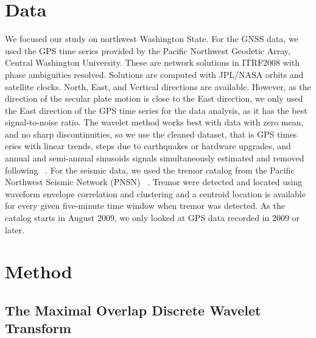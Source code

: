 \documentclass[draft]{agujournal2018}
\begin{document}
\section{Data}

We focused our study on northwest Washington State. For the GNSS data, we used the GPS time series provided by the Pacific Northwest Geodetic Array, Central Washington University. These are network solutions in ITRF2008 with phase ambiguities resolved. Solutions are computed with JPL/NASA orbits and satellite clocks. North, East, and Vertical directions are available. However, as the direction of the secular plate motion is close to the East direction, we only used the East direction of the GPS time series for the data analysis, as it has the best signal-to-noise ratio. The wavelet method works best with data with zero mean, and no sharp discontinuities, so we use the cleaned dataset, that is GPS times eries with linear trends, steps due to earthquakes or hardware upgrades, and annual and semi-annual sinusoids signals simultaneously estimated and removed following ~\citet{SZE_2004}. For the seismic data, we used the tremor catalog from the Pacific Northwest Seismic Network (PNSN) ~\citep{WEC_2010}. Tremor were detected and located using waveform envelope correlation and clustering and a centroid location is available for every given five-minute time window when tremor was detected. As the catalog starts in August 2009, we only looked at GPS data recorded in 2009 or later. \\

\section{Method} 

\subsection{The Maximal Overlap Discrete Wavelet Transform}
\end{document}
